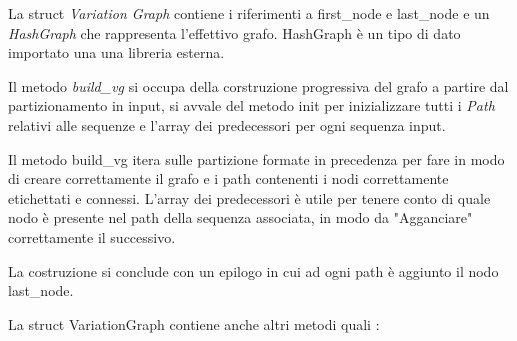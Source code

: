 La struct \textit{Variation Graph} contiene i riferimenti a first\_node e last\_node e un \textit{HashGraph} che rappresenta l'effettivo grafo. HashGraph è un tipo di dato importato una una libreria esterna.

Il metodo \textit{build\_vg} si occupa della corstruzione progressiva del grafo a partire dal partizionamento in input, si avvale del metodo init per inizializzare tutti i \textit{Path} relativi alle sequenze e l'array dei predecessori per ogni sequenza input. 

Il metodo build\_vg itera sulle partizione formate in precedenza per fare in modo di creare correttamente il grafo e i path contenenti i nodi correttamente etichettati e connessi. L'array dei predecessori è utile per tenere conto di quale nodo è presente nel path della sequenza associata, in modo da "Agganciare" correttamente il successivo.

La costruzione si conclude con un epilogo in cui ad ogni path è aggiunto il nodo last\_node.

La struct VariationGraph contiene anche altri metodi quali : 

